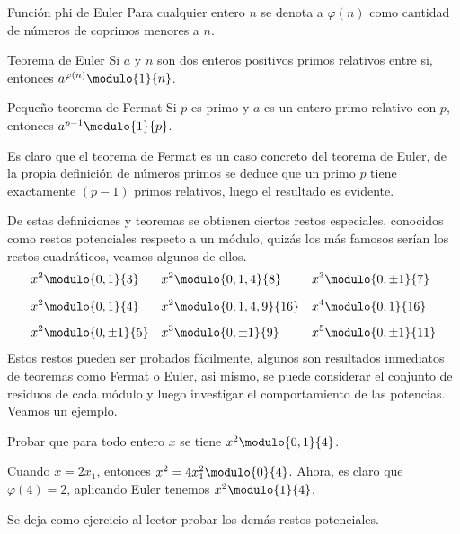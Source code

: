 \begin{definition.box}{Función phi de Euler}{}
    Para cualquier entero $n$ se denota a $\varphi(n)$ como cantidad de números de coprimos menores a $n$.
\end{definition.box}

\begin{theorem.box}{Teorema de Euler}{}
    Si $a$ y $n$ son dos enteros positivos primos relativos entre si, entonces $a^{\varphi(n)} \modulo{1}{n}$.
\end{theorem.box}

\begin{theorem.box}{Pequeño teorema de Fermat}{}
    Si $p$ es primo y $a$ es un entero primo relativo con $p$, entonces $a^{p - 1} \modulo{1}{p}$.
\end{theorem.box}

Es claro que el teorema de Fermat es un caso concreto del teorema de Euler, de la propia definición de números primos
se deduce que un primo $p$ tiene exactamente $(p - 1)$ primos relativos, luego el resultado es evidente.

De estas definiciones y teoremas se obtienen ciertos restos especiales, conocidos como restos potenciales respecto a
un módulo, quizás los más famosos serían los restos cuadráticos, veamos algunos de ellos.
\begin{align*}
    &x^2 \modulo{0,1}{3}     && x^2 \modulo{0,1,4}{8}    && x^3 \modulo{0,\pm 1}{7}\\[2mm]
    &x^2 \modulo{0,1}{4}     && x^2 \modulo{0,1,4,9}{16} && x^4 \modulo{0,1}{16}\\[1.6mm]
    &x^2 \modulo{0,\pm 1}{5} && x^3 \modulo{0,\pm 1}{9}  && x^5 \modulo{0,\pm 1}{11}
\end{align*}
Estos restos pueden ser probados fácilmente, algunos son resultados inmediatos de teoremas como Fermat o Euler, asi mismo,
se puede considerar el conjunto de residuos de cada módulo y luego investigar el comportamiento de las potencias.
Veamos un ejemplo.

\begin{example}
    Probar que para todo entero $x$ se tiene $x^2 \modulo{0,1}{4}$.
\end{example}
\begin{solution}
    Cuando $x = 2x_1$, entonces $x^2 = 4x_1^2 \modulo{0}{4}$.
    Ahora, es claro que $\varphi(4) = 2$, aplicando Euler tenemos $x^2 \modulo{1}{4}$.
\end{solution}

Se deja como ejercicio al lector probar los demás restos potenciales.

